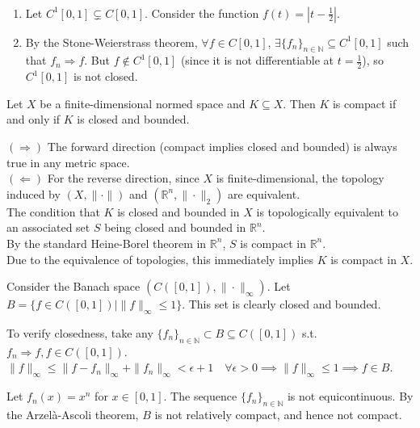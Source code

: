\begin{example}\ \vspace{-1em}
    \begin{enumerate}
        \item Let $C^1[0,1] \subsetneq C[0,1]$. 
        Consider the function $\displaystyle f(t) = \left| t - \frac{1}{2} \right|$.
        
        \item By the Stone-Weierstrass theorem, $\forall f \in C[0,1]$, $\exists \{f_n\}_{n \in \mathbb{N}} \subseteq C^1[0,1]$ such that $f_n \Rightarrow f$. 
        But $f \notin C^1[0,1]$ (since it is not differentiable at $t = \frac{1}{2}$), so $C^1[0,1]$ is not closed.
    \end{enumerate}
\end{example}


\begin{theorem}
    Let $X$ be a finite-dimensional normed space and $K \subseteq X$. Then $K$ is compact if and only if $K$ is closed and bounded.
\end{theorem}

\begin{pfbox}
    $(\Rightarrow)$ The forward direction (compact implies closed and bounded) is always true in any metric space. \\
    $(\Leftarrow)$ For the reverse direction, since $X$ is finite-dimensional, the topology induced by $(X, \|\cdot\|)$ and $(\mathbb{R}^n, \|\cdot\|_2)$ are equivalent. \\
    The condition that $K$ is closed and bounded in $X$ is topologically equivalent to an associated set $S$ being closed and bounded in $\mathbb{R}^n$. \\
    By the standard Heine-Borel theorem in $\mathbb{R}^n$, $S$ is compact in $\mathbb{R}^n$. \\
    Due to the equivalence of topologies, this immediately implies $K$ is compact in $X$.
\end{pfbox}

\begin{example}
    Consider the Banach space $(C([0,1]), \|\cdot\|_\infty)$. 
    Let $B = \{f \in C([0,1]) \mid \|f\|_\infty \le 1\}$. This set is clearly closed and bounded.
    
    To verify closedness, take any $\{f_n\}_{n \in \mathbb{N}} \subset B \subseteq C([0,1])$ s.t. $f_n \Rightarrow f, f \in C([0,1])$. \\
    $\|f\|_\infty \le \|f - f_n\|_\infty + \|f_n\|_\infty < \epsilon + 1 \quad \forall \epsilon > 0 \implies \|f\|_\infty \le 1 \implies f \in B.$

    Let $f_n(x) = x^n$ for $x \in [0,1]$. 
    The sequence $\{f_n\}_{n \in \mathbb{N}}$ is not equicontinuous. 
    By the Arzel\`a-Ascoli theorem, $B$ is not relatively compact, and hence not compact.
\end{example}




